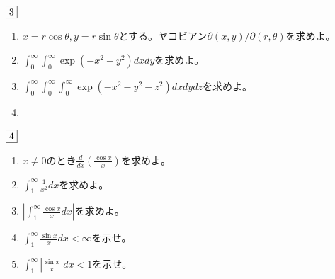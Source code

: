 \documentclass[dvipdfmx]{jsreport}
\newcounter{num}[section]
\begin{document}
\begin{tcolorbox} %
	$\fbox{3}$
\begin{enumerate}
	\item $x= r\cos{\theta}, y= r\sin{\theta}$とする。ヤコビアン${\partial(x, y)}/{\partial(r, \theta)}$を求めよ。
	\item $\int_0^\infty \int_0^\infty \exp{(-x^2- y^2)}dxdy$を求めよ。
	\item $\int_0^\infty \int_0^\infty\int_0^\infty \exp{(-x^2- y^2- z^2)}dxdydz$を求めよ。
	\item 
\end{enumerate}
\end{tcolorbox}

\begin{tcolorbox} %
	$\fbox{4}$
\begin{enumerate}
	\item $x\ne 0$のとき$\frac{d}{dx}\left(\frac{\cos{x}}{x}\right)$を求めよ。
	\item $\int_1^\infty \frac{1}{x^2}dx$を求めよ。
	\item $\left|\int_1^\infty \frac{\cos{x}}{x}dx\right|$を求めよ。
	\item $\int_1^\infty \frac{\sin{x}}{x} dx< \infty$を示せ。
	\item $\int_1^\infty \left|\frac{\sin{x}}{x}\right|dx< 1$を示せ。
\end{enumerate}
\end{tcolorbox}
\end{document}
